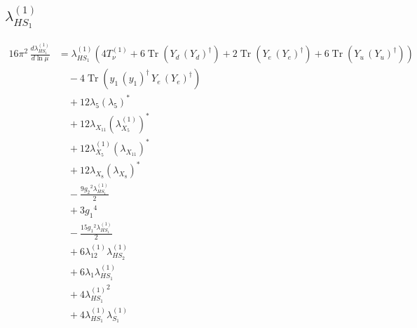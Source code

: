 \documentclass[10pt,a4paper]{article}
\begin{document}
\subsection*{$\lambda_{HS_1}^{(1)}$}
\begin{align*}
16\pi^2\,\frac{d \lambda_{HS_1}^{(1)}}{d\ln\mu} &={\lambda_{HS_1}^{(1)}} (4 T_{\nu}^{(1)}+6 \operatorname{Tr}\!\left({Y_d}\,\left({Y_d}\right)^{\dagger}\right)+2 \operatorname{Tr}\!\left({Y_e}\,\left({Y_e}\right)^{\dagger}\right)+6 \operatorname{Tr}\!\left({Y_u}\,\left({Y_u}\right)^{\dagger}\right)) \\
&\quad -4 \operatorname{Tr}\!\left({y_1}\,\left({y_1}\right)^{\dagger}\,{Y_e}\,\left({Y_e}\right)^{\dagger}\right) \\
&\quad +12 {\lambda_5} \left({\lambda_5}\right)^{*} \\
&\quad +12 {\lambda_{X_{11}}} \left({\lambda_{X_{5}}^{(1)}}\right)^{*} \\
&\quad +12 {\lambda_{X_{5}}^{(1)}} \left({\lambda_{X_{11}}}\right)^{*} \\
&\quad +12 {\lambda_{X_{8}}} \left({\lambda_{X_{8}}}\right)^{*} \\
&\quad -\frac{9 {g_2}^2 {\lambda_{HS_1}^{(1)}}}{2} \\
&\quad +3 {g_1}^4 \\
&\quad -\frac{15 {g_1}^2 {\lambda_{HS_1}^{(1)}}}{2} \\
&\quad +6 {\lambda_{12}^{(1)}} {\lambda_{HS_2}^{(1)}} \\
&\quad +6 {\lambda_1} {\lambda_{HS_1}^{(1)}} \\
&\quad +4 {\lambda_{HS_1}^{(1)}}^2 \\
&\quad +4 {\lambda_{HS_1}^{(1)}} {\lambda_{S_1}^{(1)}} \\
\end{align*}
\end{document}
